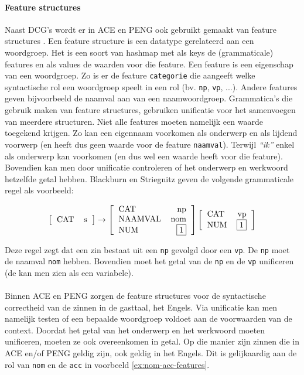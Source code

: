 \documentclass[]{article}
\theoremstyle{definition}
\newcommand{\example}[1]{\textit{``#1''}}
\begin{document}
\paragraph{Feature structures} Naast DCG's wordt er in ACE en PENG ook gebruikt gemaakt van feature structures \cite{Shieber2003}. Een feature structure \cite{NLPCourse} is een datatype gerelateerd aan een woordgroep. Het is een soort van hashmap met als keys de (grammaticale) features en als values de waarden voor die feature. Een feature is een eigenschap van een woordgroep. Zo is er de feature \texttt{categorie} die aangeeft welke syntactische rol een woordgroep speelt in een rol (bv. \texttt{np}, \texttt{vp}, ...). Andere features geven bijvoorbeeld de naamval aan van een naamwoordgroep. Grammatica's die gebruik maken van feature structures, gebruiken unificatie voor het samenvoegen van meerdere structuren. Niet alle features moeten namelijk een waarde toegekend krijgen. Zo kan een eigennaam voorkomen als onderwerp en als lijdend voorwerp (en heeft dus geen waarde voor de feature \texttt{naamval}). Terwijl \example{ik} enkel als onderwerp kan voorkomen (en dus wel een waarde heeft voor die feature). Bovendien kan men door unificatie controleren of het onderwerp en werkwoord hetzelfde getal hebben. Blackburn en Striegnitz \cite{NLPCourse} geven de volgende grammaticale regel als voorbeeld:

\[
  \left [
    \begin{tabular}{lr}
      CAT & s
    \end{tabular}
  \right ]
  \rightarrow
  \left [
    \begin{tabular}{lr}
      CAT & np \\
      NAAMVAL & nom \\
      NUM & \framebox{1}
    \end{tabular}
  \right ]
  \left [
    \begin{tabular}{lr}
      CAT & vp \\
      NUM & \framebox{1}
    \end{tabular}
  \right ]
\]

Deze regel zegt dat een zin bestaat uit een \texttt{np} gevolgd door een \texttt{vp}. De \texttt{np} moet de naamval \texttt{nom} hebben. Bovendien moet het getal van de \texttt{np} en de \texttt{vp} unificeren (de  kan men zien als een variabele).

\paragraph{} Binnen ACE en PENG zorgen de feature structures voor de syntactische correctheid van de zinnen in de gasttaal, het Engels. Via unificatie kan men namelijk testen of een bepaalde woordgroep voldoet aan de voorwaarden van de context. Doordat het getal van het onderwerp en het werkwoord moeten unificeren, moeten ze ook overeenkomen in getal. Op die manier zijn zinnen die in ACE en/of PENG geldig zijn, ook geldig in het Engels. Dit is gelijkaardig aan de rol van \texttt{nom} en de \texttt{acc} in voorbeeld \ref{ex:nom-acc-features}.
\end{document}
